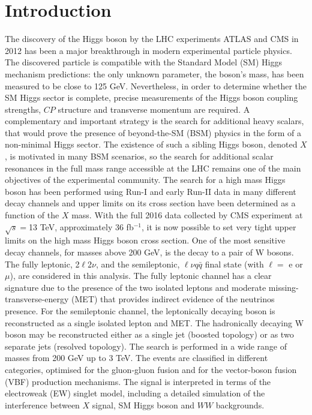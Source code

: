\documentclass[PhD,binding=0.6cm]{../sapthesis}
\begin{document}
\chapter{Introduction}
The discovery of the Higgs boson by the LHC experiments ATLAS and CMS in 2012 has been a major breakthrough in modern experimental particle physics.
The discovered particle is compatible with the Standard Model (SM) Higgs mechanism predictions: the only unknown parameter, the boson's mass, has been
measured to be  close to 125 GeV. Nevertheless, in order to determine whether the SM Higgs sector is complete, precise measurements of the Higgs boson coupling strengths, $CP$ structure and transverse momentum are required. 
A complementary and important strategy is the search for additional heavy
scalars, that would prove the presence of  beyond-the-SM (BSM) physics in
the form of a non-minimal Higgs sector. The existence of such a sibling Higgs boson,
denoted $X$, is motivated in many BSM scenarios, so the search for additional scalar resonances in the full
mass range accessible at the LHC remains one of the main objectives of the experimental community.
The search for a high mass Higgs boson has been performed using Run-I and
early Run-II data in many different decay channels and upper limits on its cross section have been determined as a function of the $X$ mass. 
With the full 2016 data collected by CMS experiment at $\sqrt{s}=$13 TeV, approximately  36 fb$^{-1}$, 
it is now possible to set very tight upper limits on the high mass Higgs boson cross section. 
One of the most sensitive decay channels, for masses above 200 GeV, is
the decay to a pair of W bosons. 
The fully leptonic, 2$\ell$2$\nu$,  and the semileptonic, $\ell \nu q \bar{q}$ final state (with $\ell =$ e or $\mu$), are considered in this analysis.
The fully leptonic channel has a clear signature due to the presence of the two isolated leptons and moderate missing-transverse-energy (MET) that provides indirect evidence of the neutrinos presence.
For the semileptonic channel, the leptonically decaying boson is reconstructed as a single isolated lepton and MET.
The hadronically decaying W boson may be reconstructed either as a single jet
(boosted topology) or as two separate jets (resolved topology). 
The search is performed in a wide range of masses from 200 GeV up to 3 TeV.
The  events are classified in  different categories, optimised for the gluon-gluon fusion and for the vector-boson fusion (VBF) production mechanisms.
The signal is interpreted in terms of the electroweak (EW) singlet model, including a detailed simulation of the interference between $X$ signal, SM Higgs boson  and $WW$ backgrounds.
\end{document}

